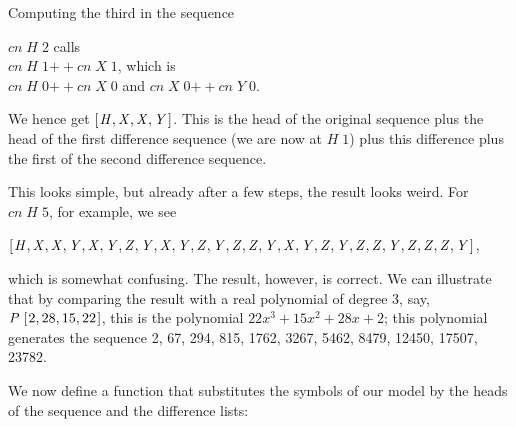 \documentclass[tikz]{scrreprt}
\newcommand{\Conid}[1]{\mathit{#1}}
\newcommand{\Varid}[1]{\mathit{#1}}
\newcommand{\plus}{\mathbin{+\!\!\!+}}
\begin{document}
Computing the third in the sequence

\ensuremath{\Varid{cn}\;\Conid{H}\;\mathrm{2}} calls\\
\ensuremath{\Varid{cn}\;\Conid{H}\;\mathrm{1}\plus \Varid{cn}\;\Conid{X}\;\mathrm{1}}, which is\\
\ensuremath{\Varid{cn}\;\Conid{H}\;\mathrm{0}\plus \Varid{cn}\;\Conid{X}\;\mathrm{0}} and \ensuremath{\Varid{cn}\;\Conid{X}\;\mathrm{0}\plus \Varid{cn}\;\Conid{Y}\;\mathrm{0}}.

We hence get \ensuremath{[\mskip1.5mu \Conid{H},\Conid{X},\Conid{X},\Conid{Y}\mskip1.5mu]}.
This is the head of the original sequence
plus the head of the first difference sequence
(we are now at \ensuremath{\Conid{H}\;\mathrm{1}})
plus this difference plus the first of
the second difference sequence.

This looks simple, but already after a few steps,
the result looks weird. For \ensuremath{\Varid{cn}\;\Conid{H}\;\mathrm{5}}, for example, we see

\ensuremath{[\mskip1.5mu \Conid{H},\Conid{X},\Conid{X},\Conid{Y},\Conid{X},\Conid{Y},\Conid{Z},\Conid{Y},\Conid{X},\Conid{Y},\Conid{Z},\Conid{Y},\Conid{Z},\Conid{Z},\Conid{Y},\Conid{X},\Conid{Y},\Conid{Z},\Conid{Y},\Conid{Z},\Conid{Z},\Conid{Y},\Conid{Z},\Conid{Z},\Conid{Z},\Conid{Y}\mskip1.5mu]},

which is somewhat confusing. The result, however,
is correct. We can illustrate that by comparing
the result with a real polynomial of degree 3, say,
\ensuremath{\Conid{P}\;[\mskip1.5mu \mathrm{2},\mathrm{28},\mathrm{15},\mathrm{22}\mskip1.5mu]}, this is the polynomial
$22x^3 + 15x^2 + 28x + 2$; 
this polynomial generates the sequence
2, 67, 294, 815, 1762, 3267, 5462, 8479, 12450, 17507, 23782.

We now define a function that substitutes the symbols
of our model by the heads of the sequence and the
difference lists:
\end{document}
